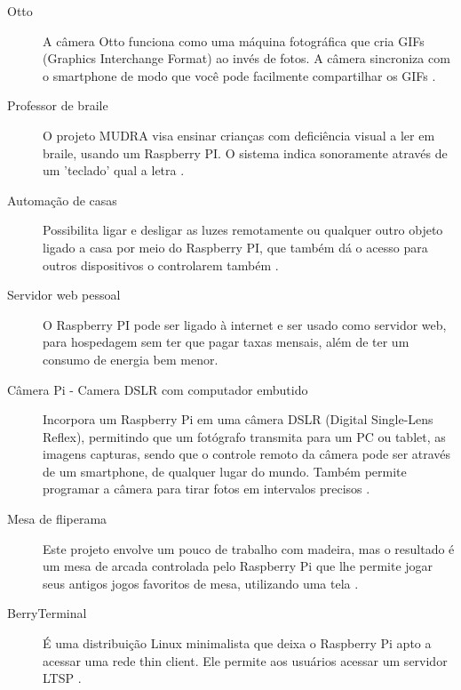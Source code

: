 \documentclass[
	12pt,				%
	openright,			%
	twoside,			%
	a4paper,			%
	chapter=TITLE,		%
	english,			%
	brazil				%
	]{abntex2}
\begin{document}
\begin{description}

\item[Otto]A câmera Otto funciona como uma máquina fotográfica que cria GIFs (Graphics Interchange Format) ao invés de fotos. A câmera sincroniza com o smartphone de modo que você pode facilmente compartilhar os GIFs \cite{otto}.
  
\item[Professor de braile] O projeto MUDRA visa ensinar crianças com deficiência visual a ler em braile, usando um Raspberry PI. O sistema indica sonoramente através de um ’teclado’ qual a  letra \cite{mudra}.

\item[Automação de casas] Possibilita ligar e desligar as luzes remotamente ou qualquer outro objeto ligado a casa por meio do Raspberry PI, que também dá o acesso para outros dispositivos o controlarem também \cite{AplicacaoRaspberry}.

\item[Servidor web pessoal] O Raspberry PI pode ser ligado à internet e ser usado como servidor web, para hospedagem sem ter que pagar taxas mensais, além de ter um consumo de energia bem menor.


\item[Câmera Pi - Camera  DSLR com computador embutido] Incorpora um Raspberry Pi em uma câmera DSLR (Digital Single-Lens Reflex), permitindo que um fotógrafo transmita para um PC ou tablet, as imagens capturas, sendo que o controle remoto da câmera pode ser através de um smartphone, de qualquer lugar do mundo. Também permite programar a câmera para tirar fotos em intervalos precisos \cite{cameraPI}.

\item[Mesa de fliperama] Este projeto envolve um pouco de trabalho com madeira, mas o resultado é um mesa de arcada controlada pelo Raspberry Pi que lhe permite jogar seus antigos jogos favoritos de mesa, utilizando uma tela \cite{AplicacaoRaspberry}.

\item[BerryTerminal] É uma distribuição Linux minimalista que deixa o Raspberry Pi apto a acessar uma rede thin client. Ele permite aos usuários acessar um servidor LTSP \cite{berryterminal}.

\end{description}


\end{document}

